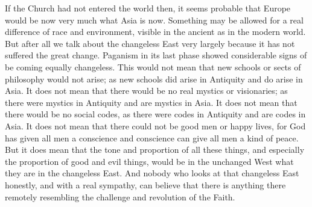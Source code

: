 If the Church had not entered the world then, it seems probable that Europe would be now very much what Asia is now. Something may be allowed for a real difference of race and environment, visible in the ancient as in the modern world. But after all we talk about the changeless East very largely because it has not suffered the great change. Paganism in its last phase showed considerable signs of be coming equally changeless. This would not mean that new schools or sects of philosophy would not arise; as new schools did arise in Antiquity and do arise in Asia. It does not mean that there would be no real mystics or visionaries; as there were mystics in Antiquity and are mystics in Asia. It does not mean that there would be no social codes, as there were codes in Antiquity and are codes in Asia. It does not mean that there could not be good men or happy lives, for God has given all men a conscience and conscience can give all men a kind of peace. But it does mean that the tone and proportion of all these things, and especially the proportion of good and evil things, would be in the unchanged West what they are in the changeless East. And nobody who looks at that changeless East honestly, and with a real sympathy, can believe that there is anything there remotely resembling the challenge and revolution of the Faith.


